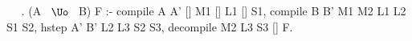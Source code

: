 ~  ~.
(A ~$\Uo$~ B) F :-
  compile A A' [] M1 [] L1 [] S1,
  compile B B' M1 M2 L1 L2 S1 S2,
  hstep A' B' L2 L3 S2 S3,
  decompile M2 L3 S3 [] F.
